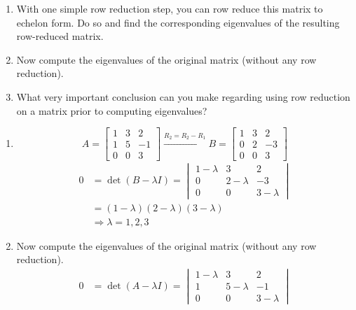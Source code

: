 \documentclass[letter,11pt]{article}
\theoremstyle{definition}
\begin{document}
\begin{enumerate}[label = (\Alph*.)]
    \item With one simple row reduction step, you can row reduce this matrix to echelon form. Do so and find the corresponding eigenvalues of the resulting row-reduced matrix.
    \item Now compute the eigenvalues of the original matrix (without any row reduction).
    \item What very important conclusion can you make regarding using row reduction on a matrix prior to computing eigenvalues?
\end{enumerate}

\begin{tcolorbox}[boxrule=1mm,enhanced jigsaw, breakable,before=\hfill,after=\hfill,adjusted title={Problem 3 solutions}]
    \begin{enumerate}[label = (\Alph*.)]
    \item $$A= \begin{bmatrix} 1 & 3 & 2\\ 1 & 5 & -1\\ 0 & 0 & 3\end{bmatrix} \xrightarrow{R_2 = R_{2}-R_1} B = \begin{bmatrix} 1 & 3 & 2\\ 0 & 2 & -3\\ 0 & 0 & 3\end{bmatrix}$$
        \begin{align*}
                0 &=\operatorname{det}(B-\lambda I) = \begin{vmatrix} 1-\lambda & 3 & 2\\ 0 & 2-\lambda & -3\\ 0 & 0 & 3-\lambda \end{vmatrix}\\
                &= \left(1-\lambda\right)(2-\lambda)(3-\lambda)\\
                &\Rightarrow \boxed{\lambda = 1, 2, 3}
            \end{align*}  
    \item Now compute the eigenvalues of the original matrix (without any row reduction).
    \begin{align*}
                0 &=\operatorname{det}(A-\lambda I) = \begin{vmatrix} 1-\lambda & 3 & 2\\ 1 & 5-\lambda & -1\\ 0 & 0 & 3-\lambda \end{vmatrix}\\

\end{align*}
\end{enumerate}
\end{tcolorbox}
\end{document}
